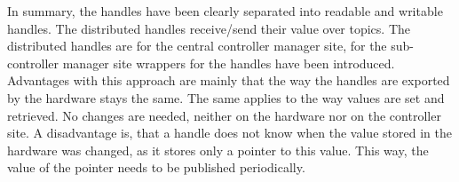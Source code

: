 In summary, the \glspl{handle} have been clearly separated into readable and writable \glspl{handle}. The distributed \glspl{handle} receive/send their value over topics. The distributed \glspl{handle} are for the central controller manager site, for the sub-controller manager site wrappers for the handles have been introduced.\newline 
Advantages with this approach are mainly that the way the \glspl{handle} are exported by the hardware stays the same. The same applies to the way values are set and retrieved. No changes are needed, neither on the hardware nor on the controller site.\newline
A disadvantage is, that a \gls{handle} does not know when the value stored in the hardware was changed, as it stores only a pointer to this value. This way, the value of the pointer needs to be published periodically.

